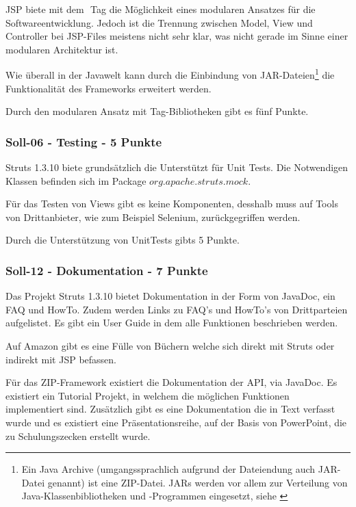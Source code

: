   \ac{JSP} biete mit dem \(<jsp:include>\) Tag die Möglichkeit eines modularen
  Ansatzes für die Softwareentwicklung. Jedoch ist die Trennung zwischen Model,
  View und Controller bei JSP-Files meistens nicht sehr klar, was nicht gerade
  im Sinne einer modularen Architektur ist.
  
  Wie überall in der Javawelt kann durch die Einbindung von
  JAR-Dateien\footnote{Ein Java Archive (umgangssprachlich aufgrund der
  Dateiendung auch JAR-Datei genannt) ist eine ZIP-Datei. JARs werden vor allem
  zur Verteilung von Java-Klassenbibliotheken und -Programmen eingesetzt, siehe
  \cite{JARDatei}} die Funktionalität des Frameworks erweitert werden.
  
  Durch den modularen Ansatz mit Tag-Bibliotheken gibt es fünf Punkte.
  
  \subsubsection{Soll-06 - Testing - 5 Punkte}
  
  Struts 1.3.10 biete grundsätzlich die Unterstützt für Unit Tests. Die
  Notwendigen Klassen befinden sich im Package \(org.apache.struts.mock\).
  
  Für das Testen von Views gibt es keine Komponenten, desshalb muss auf Tools
  von Drittanbieter, wie zum Beispiel Selenium, zurückgegriffen werden.
  
  Durch die Unterstützung von UnitTests gibts 5 Punkte.
  
  \subsubsection{Soll-12 - Dokumentation - 7 Punkte}
  
  Das Projekt Struts 1.3.10 bietet Dokumentation in der Form von JavaDoc, ein
  FAQ und HowTo. Zudem werden Links zu FAQ's und HowTo's von Drittparteien
  aufgelistet. Es gibt ein User Guide in dem alle Funktionen beschrieben werden.
  
  Auf Amazon gibt es eine Fülle von Büchern welche sich direkt mit Struts oder
  indirekt mit \ac{JSP} befassen.
  
  Für das \ac{ZIP}-Framework existiert die Dokumentation der API, via JavaDoc.
  Es existiert ein Tutorial Projekt, in welchem die möglichen Funktionen
  implementiert sind. Zusätzlich gibt es eine Dokumentation die in Text
  verfasst wurde und es existiert eine Präsentationsreihe, auf der Basis von
  PowerPoint, die zu Schulungszecken erstellt wurde.
  
